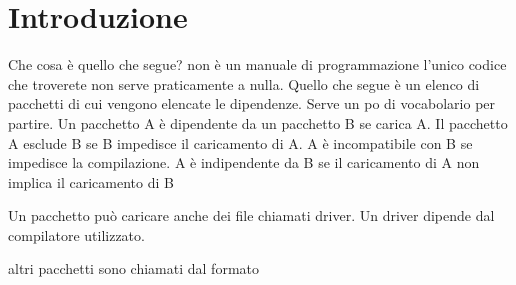 \chapter{Introduzione}
Che cosa è quello che segue? non è un manuale di programmazione l'unico codice che troverete non serve praticamente a nulla. Quello che segue è un elenco di pacchetti di cui vengono elencate le dipendenze. Serve un po di vocabolario per partire. Un pacchetto A è dipendente da un pacchetto B se carica A. Il pacchetto A esclude B se B impedisce il caricamento di A.   A è incompatibile con B se impedisce la compilazione. A è indipendente da B se il caricamento di A non implica il caricamento di B


Un pacchetto può caricare anche dei file chiamati driver. Un driver dipende dal compilatore utilizzato.

altri  pacchetti sono chiamati dal formato




